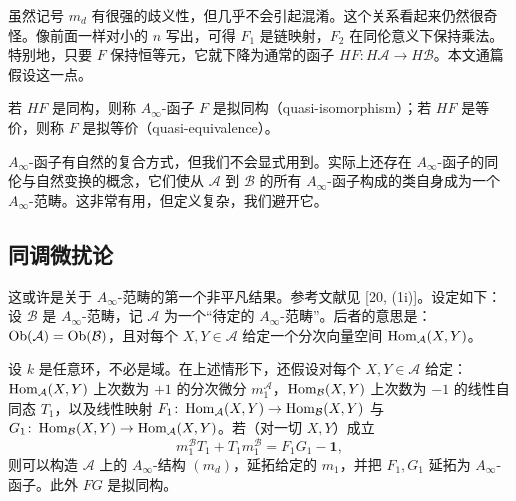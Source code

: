 
虽然记号 $m_d$ 有很强的歧义性，但几乎不会引起混淆。这个关系看起来仍然很奇怪。像前面一样对小的 $n$ 写出，可得 $F_1$ 是链映射，$F_2$ 在同伦意义下保持乘法。特别地，只要 $F$ 保持恒等元，它就下降为通常的函子 $HF\colon H\mathcal{A}\to H\mathcal{B}$。本文通篇假设这一点。

若 $HF$ 是同构，则称 $A_\infty$-函子 $F$ 是拟同构（quasi-isomorphism）；若 $HF$ 是等价，则称 $F$ 是拟等价（quasi-equivalence）。

$A_\infty$-函子有自然的复合方式，但我们不会显式用到。实际上还存在 $A_\infty$-函子的同伦与自然变换的概念，它们使从 $\mathcal{A}$ 到 $\mathcal{B}$ 的所有 $A_\infty$-函子构成的类自身成为一个 $A_\infty$-范畴。这非常有用，但定义复杂，我们避开它。

\subsection{同调微扰论}\label{subsec:ainf-hpt}

这或许是关于 $A_\infty$-范畴的第一个非平凡结果。参考文献见 [20, (1i)]。设定如下：设 $\mathcal{B}$ 是 $A_\infty$-范畴，记 $\mathcal{A}$ 为一个“待定的 $A_\infty$-范畴”。后者的意思是：$\operatorname{Ob}(\mathcal{A})=\operatorname{Ob}(\mathcal{B})$，且对每个 $X,Y\in\mathcal{A}$ 给定一个分次向量空间 $\operatorname{Hom}_{\mathcal{A}}(X,Y)$。

\begin{theorem}[同调微扰引理]\label{thm:2.1}
设 $k$ 是任意环，不必是域。在上述情形下，还假设对每个 $X,Y\in\mathcal{A}$ 给定：$\operatorname{Hom}_{\mathcal{A}}(X,Y)$ 上次数为 $+1$ 的分次微分 $m_1^{\mathcal{A}}$，$\operatorname{Hom}_{\mathcal{B}}(X,Y)$ 上次数为 $-1$ 的线性自同态 $T_1$，以及线性映射 $F_1\colon\operatorname{Hom}_{\mathcal{A}}(X,Y)\to\operatorname{Hom}_{\mathcal{B}}(X,Y)$ 与 $G_1\colon\operatorname{Hom}_{\mathcal{B}}(X,Y)\to\operatorname{Hom}_{\mathcal{A}}(X,Y)$。若（对一切 $X,Y$）成立
\begin{equation}\label{eq:ainf-hpt}
m_1^{\mathcal{B}}T_1+T_1m_1^{\mathcal{B}}=F_1G_1-\mathbf{1},
\end{equation}
则可以构造 $\mathcal{A}$ 上的 $A_\infty$-结构 $(m_d)$，延拓给定的 $m_1$，并把 $F_1,G_1$ 延拓为 $A_\infty$-函子。此外 $FG$ 是拟同构。
\end{theorem}

